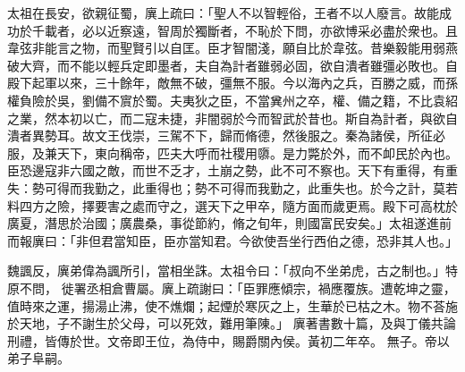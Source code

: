 \begin{pinyinscope}
 
 太祖在長安，欲親征蜀，廙上疏曰：「聖人不以智輕俗，王者不以人廢言。故能成功於千載者，必以近察遠，智周於獨斷者，不恥於下問，亦欲博采必盡於衆也。且韋弦非能言之物，而聖賢引以自匡。臣才智闇淺，願自比於韋弦。昔樂毅能用弱燕破大齊，而不能以輕兵定即墨者，夫自為計者雖弱必固，欲自潰者雖彊必敗也。自殿下起軍以來，三十餘年，敵無不破，彊無不服。今以海內之兵，百勝之威，而孫權負險於吳，劉備不賔於蜀。夫夷狄之臣，不當兾州之卒，權、備之籍，不比袁紹之業，然本初以亡，而二寇未捷，非闇弱於今而智武於昔也。斯自為計者，與欲自潰者異勢耳。故文王伐崇，三駕不下，歸而脩德，然後服之。秦為諸侯，所征必服，及兼天下，東向稱帝，匹夫大呼而社稷用隳。是力斃於外，而不卹民於內也。臣恐邊寇非六國之敵，而世不乏才，土崩之勢，此不可不察也。天下有重得，有重失：勢可得而我勤之，此重得也；勢不可得而我勤之，此重失也。於今之計，莫若料四方之險，擇要害之處而守之，選天下之甲卒，隨方面而歲更焉。殿下可高枕於廣夏，潛思於治國；廣農桑，事從節約，脩之旬年，則國富民安矣。」太祖遂進前而報廙曰：「非但君當知臣，臣亦當知君。今欲使吾坐行西伯之德，恐非其人也。」
 
 
魏諷反，廙弟偉為諷所引，當相坐誅。太祖令曰：「叔向不坐弟虎，古之制也。」特原不問，
 徙署丞相倉曹屬。廙上疏謝曰：「臣罪應傾宗，禍應覆族。遭乾坤之靈，值時來之運，揚湯止沸，使不燋爛；起煙於寒灰之上，生華於已枯之木。物不荅施於天地，子不謝生於父母，可以死效，難用筆陳。」
 廙著書數十篇，及與丁儀共論刑禮，皆傳於世。文帝即王位，為侍中，賜爵關內侯。黃初二年卒。
 無子。帝以弟子阜嗣。
 
 
\end{pinyinscope}